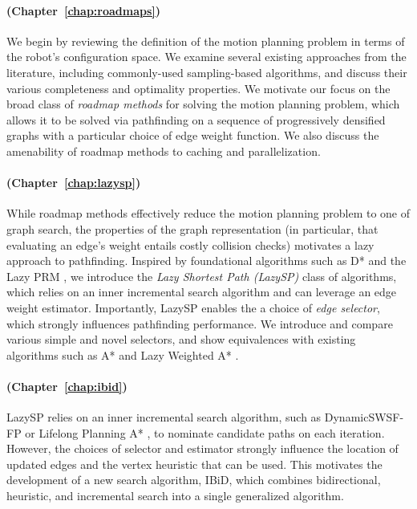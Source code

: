 \paragraph{ (Chapter~\ref{chap:roadmaps})}
We begin by reviewing the definition of the motion planning problem
in terms of the robot's configuration space.
We examine several existing approaches from the literature,
including commonly-used sampling-based algorithms,
and discuss their various completeness and optimality properties.
We motivate our focus on the broad class of \emph{roadmap methods}
for solving the motion planning problem,
which allows it to be solved via pathfinding on a sequence of
progressively densified graphs
with a particular choice of edge weight function.
We also discuss the amenability of roadmap methods
to caching and parallelization.

\paragraph{ (Chapter~\ref{chap:lazysp})}
While roadmap methods effectively reduce the motion planning problem
to one of graph search,
the properties of the graph representation
(in particular, that evaluating an edge's weight entails costly
collision checks)
motivates a lazy approach to pathfinding.
Inspired by foundational algorithms
such as D* \citep{stentz1994dstar}
and the Lazy PRM \citep{bohlin2000lazyprm},
we introduce the \emph{Lazy Shortest Path (LazySP)} class of algorithms,
which relies on an inner incremental search algorithm
and can leverage an edge weight estimator. 
Importantly,
LazySP enables the a choice of \emph{edge selector},
which strongly influences pathfinding performance.
We introduce and compare various simple and novel selectors,
and show equivalences with existing algorithms
such as A* \citep{hart1968astar}
and Lazy Weighted A* \citep{cohen2014narms}.

\paragraph{ (Chapter~\ref{chap:ibid})}
LazySP relies on an inner incremental search algorithm,
such as DynamicSWSF-FP \citep{ramalingam1996dynamicswsffp}
or Lifelong Planning A* \citep{koenig2004lpastar},
to nominate candidate paths on each iteration.
However,
the choices of selector and estimator strongly influence
the location of updated edges
and the vertex heuristic that can be used.
This motivates the development of a new search algorithm,
IBiD,
which combines bidirectional, heuristic, and incremental search
into a single generalized algorithm.

